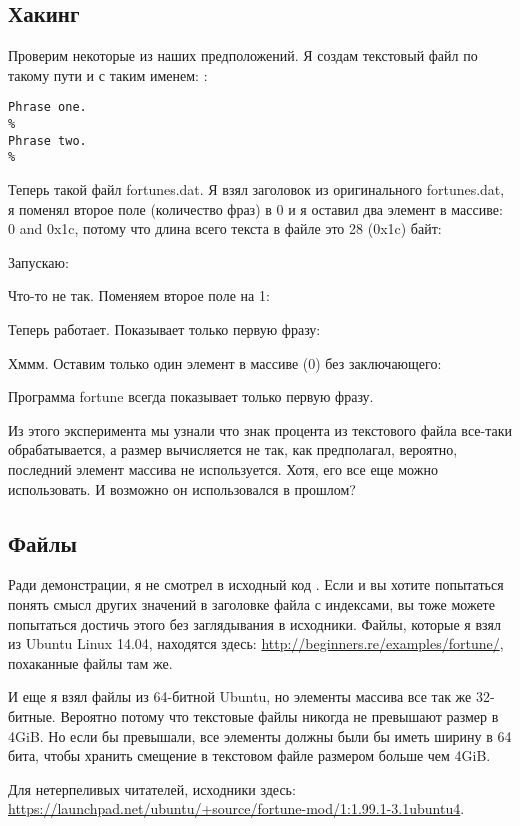 \subsection{Хакинг}

Проверим некоторые из наших предположений.
Я создам текстовый файл по такому пути и с таким именем: :

\begin{lstlisting}
Phrase one.
%
Phrase two.
%
\end{lstlisting}

Теперь такой файл fortunes.dat. Я взял заголовок из оригинального fortunes.dat, я поменял второе поле
(количество фраз) в 0 и я оставил два элемент в массиве:
0 and 0x1c, потому что длина всего текста в файле  это 28 (0x1c) байт:



Запускаю:



Что-то не так. Поменяем второе поле на 1:



Теперь работает. Показывает только первую фразу:



Хммм. Оставим только один элемент в массиве (0) без заключающего:



Программа fortune всегда показывает только первую фразу.

Из этого эксперимента мы узнали что знак процента из текстового файла все-таки обрабатывается, а размер вычисляется
не так, как предполагал, вероятно, последний элемент массива не используется.
Хотя, его все еще можно использовать. И возможно он использовался в прошлом?


\subsection{Файлы}

Ради демонстрации, я не смотрел в исходный код .
Если и вы хотите попытаться понять смысл других значений в заголовке файла с индексами, вы тоже можете попытаться
достичь этого без заглядывания в исходники.
Файлы, которые я взял из Ubuntu Linux 14.04, находятся здесь: \url{http://beginners.re/examples/fortune/}, похаканные
файлы там же.

И еще я взял файлы из 64-битной Ubuntu, но элементы массива все так же 32-битные.
Вероятно потому что текстовые файлы  никогда не превышают размер в 4\ac{GiB}.
Но если бы превышали, все элементы должны были бы иметь ширину в 64 бита, чтобы хранить смещение в текстовом файле
размером больше чем 4GiB.

Для нетерпеливых читателей, исходники  здесь:
\url{https://launchpad.net/ubuntu/+source/fortune-mod/1:1.99.1-3.1ubuntu4}.

